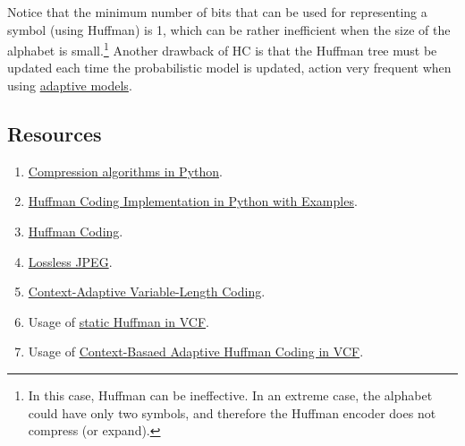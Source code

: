 Notice that the minimum number of bits that can be used for
representing a symbol (using Huffman) is 1, which can be rather
inefficient when the size of the alphabet is small.\footnote{In this
  case, Huffman can be ineffective. In an extreme case, the alphabet
  could have only two symbols, and therefore the Huffman encoder does
  not compress (or expand).} Another drawback of HC is that the Huffman
tree must be updated each time the probabilistic model is updated,
action very frequent when using
\href{https://en.wikipedia.org/wiki/Adaptive_Huffman_coding}{adaptive
  models}.

\subsection*{Resources}
\begin{enumerate}
\item \href{https://www.inference.org.uk/mackay/python/compress/#Huff}{Compression algorithms in Python}.
\item \href{https://favtutor.com/blogs/huffman-coding}{Huffman Coding Implementation in Python with Examples}.
\item \href{https://www.programiz.com/dsa/huffman-coding}{Huffman Coding}.
\item \href{https://en.wikipedia.org/wiki/Lossless_JPEG}{Lossless JPEG}.
\item \href{https://en.wikipedia.org/wiki/Context-adaptive_variable-length_coding}{Context-Adaptive Variable-Length Coding}.
\item Usage of \href{https://github.com/Sistemas-Multimedia/VCF/blob/main/notebooks/Huffman.ipynb}{static Huffman in VCF}.
\item Usage of \href{https://github.com/Sistemas-Multimedia/VCF/blob/main/notebooks/CBAHC.ipynb}{Context-Basaed Adaptive Huffman Coding in VCF}.
\end{enumerate}

